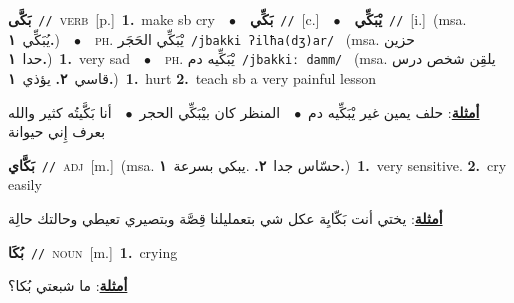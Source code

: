 \documentclass[10pt,a4paper,twoside]{article} %
\begin{document}
\begin{multicols}{2}
{\setlength\topsep{0pt}\textbf{\foreignlanguage{arabic}{بَكَّى}}\ {\color{gray}\texttt{//}\color{black}}\ \textsc{verb}\ [p.]\ \textbf{1.}~make sb cry\ \ $\bullet$\ \ \setlength\topsep{0pt}\textbf{\foreignlanguage{arabic}{بَكِّي}}\ {\color{gray}\texttt{//}\color{black}}\ [c.]\ \ $\bullet$\ \ \setlength\topsep{0pt}\textbf{\foreignlanguage{arabic}{يْبَكِّي}}\ {\color{gray}\texttt{//}\color{black}}\ [i.]\ \color{gray}(msa. \foreignlanguage{arabic}{يُبَكِّي}~\foreignlanguage{arabic}{\textbf{١.}})\color{black}\ \ $\bullet$\ \ \textsc{ph.} \color{gray} \foreignlanguage{arabic}{يْبَكِّي الحَجَر}\color{black}\ {\color{gray}\texttt{/{\sffamily jbakki ʔilħa(dʒ)ar}/}\color{black}}\ \color{gray} (msa. \foreignlanguage{arabic}{حزين حدا}~\foreignlanguage{arabic}{\textbf{١.}})\color{black}\ \textbf{1.}~very sad\ \ $\bullet$\ \ \textsc{ph.} \color{gray} \foreignlanguage{arabic}{يْبَكِّيه دم}\color{black}\ {\color{gray}\texttt{/{\sffamily jbakkiː damm}/}\color{black}}\ \color{gray} (msa. \foreignlanguage{arabic}{يلقِن شخص درس قاسي}~\foreignlanguage{arabic}{\textbf{٢.}}  \foreignlanguage{arabic}{يؤذي}~\foreignlanguage{arabic}{\textbf{١.}})\color{black}\ \textbf{1.}~hurt  \textbf{2.}~teach sb a very painful lesson\  \begin{flushright}\color{gray}\foreignlanguage{arabic}{\textbf{\underline{\foreignlanguage{arabic}{أمثلة}}}: حلف يمين غير يْبَكِّيه دم\ $\bullet$\ \  المنظر كان بيْبَكِّي الحجر\ $\bullet$\ \  أنا بَكَّيتُه كثير والله بعرف إِني حيوانة}\end{flushright}\color{black}} \vspace{2mm}

{\setlength\topsep{0pt}\textbf{\foreignlanguage{arabic}{بَكَّاي}}\ {\color{gray}\texttt{//}\color{black}}\ \textsc{adj}\ [m.]\ \color{gray}(msa. \foreignlanguage{arabic}{حسّاس جدا}~\foreignlanguage{arabic}{\textbf{٢.}}  .\foreignlanguage{arabic}{يبكي بسرعة}~\foreignlanguage{arabic}{\textbf{١.}})\color{black}\ \textbf{1.}~very sensitive.  \textbf{2.}~cry easily\  \begin{flushright}\color{gray}\foreignlanguage{arabic}{\textbf{\underline{\foreignlanguage{arabic}{أمثلة}}}: يختي أنت بَكّايِة عكل شي بتعمليلنا قِصَّة وبتصيري تعيطي وحالتك حالِة}\end{flushright}\color{black}} \vspace{2mm}

{\setlength\topsep{0pt}\textbf{\foreignlanguage{arabic}{بُكَا}}\ {\color{gray}\texttt{//}\color{black}}\ \textsc{noun}\ [m.]\ \textbf{1.}~crying\  \begin{flushright}\color{gray}\foreignlanguage{arabic}{\textbf{\underline{\foreignlanguage{arabic}{أمثلة}}}: ما شبعتي بُكا؟}\end{flushright}\color{black}} \vspace{2mm}


\end{multicols}
\end{document}
